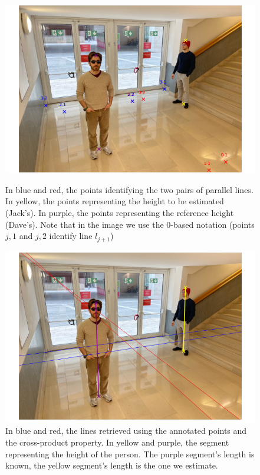 \begin{figure}[htbp]
    \centering
    \begin{minipage}[t]{0.48\textwidth}
        \centering
        \includegraphics[width=\linewidth]{img/annotated_points.png}
        \vspace{-5pt}  %
        \caption{In blue and red, the points identifying the two pairs of parallel lines. In yellow, the points representing the height to be estimated (Jack's). In purple, the points representing the reference height (Dave's). Note that in the image we use the 0-based notation (points $j,1$ and $j,2$ identify line $l_{j+1}$)}
        \label{fig:annotated_points}
    \end{minipage}
    \hfill
    \begin{minipage}[t]{0.48\textwidth}
        \centering
        \includegraphics[width=\linewidth]{img/retrieved_lines.png}
        \vspace{-5pt}  %
        \caption{In blue and red, the lines retrieved using the annotated points and the cross-product property. In yellow and purple, the segment representing the height of the person. The purple segment's length is known, the yellow segment's length is the one we estimate.}
        \label{fig:retrieved_lines}
    \end{minipage}
\end{figure}

